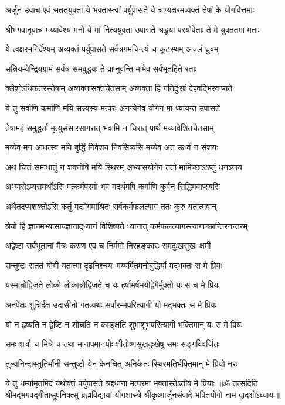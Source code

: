{अर्जुन उवाच}
\twolineshloka
{एवं सततयुक्ता ये भक्तास्त्वां पर्युपासते}
{ये चाप्यक्षरमव्यक्तं तेषां के योगवित्तमाः}%

{श्रीभगवानुवाच}\nopagebreak[4]
\twolineshloka
{मय्यावेश्य मनो ये मां नित्ययुक्ता उपासते}
{श्रद्धया परयोपेताः ते मे युक्ततमा मताः}%

\twolineshloka
{ये त्वक्षरमनिर्देश्यम् अव्यक्तं पर्युपासते}
{सर्वत्रगमचिन्त्यं च कूटस्थम् अचलं ध्रुवम्}%

\twolineshloka
{सन्नियम्येन्द्रियग्रामं सर्वत्र समबुद्धयः}
{ते प्राप्नुवन्ति मामेव सर्वभूतहिते रताः}%

\twolineshloka
{क्लेशोऽधिकतरस्तेषाम् अव्यक्तासक्तचेतसाम्}%
{अव्यक्ता हि गतिर्दुःखं देहवद्भिरवाप्यते}%

\twolineshloka
{ये तु सर्वाणि कर्माणि मयि सन्न्यस्य मत्परः}
{अनन्येनैव योगेन मां ध्यायन्त उपासते}%

\twolineshloka
{तेषामहं समुद्धर्ता मृत्युसंसारसागरात्}
{भवामि न चिरात् पार्थ मय्यावेशितचेतसाम्}%

\twolineshloka
{मय्येव मन आधत्स्व मयि बुद्धिं निवेशय}
{निवसिष्यसि मय्येव अत ऊर्ध्वं न संशयः}%

\twolineshloka
{अथ चित्तं समाधातुं न शक्नोषि मयि स्थिरम्}
{अभ्यासयोगेन ततो मामिच्छाऽऽप्तुं धनञ्जय}%

\twolineshloka
{अभ्यासेऽप्यसमर्थोऽसि मत्कर्मपरमो भव}
{मदर्थमपि कर्माणि कुर्वन् सिद्धिमवाप्स्यसि}%

\twolineshloka
{अथैतदप्यशक्तोऽसि कर्तुं मद्योगमाश्रितः}
{सर्वकर्मफलत्यागं ततः कुरु यतात्मवान्}%

\twolineshloka
{श्रेयो हि ज्ञानमभ्यासाज्ज्ञानाद्‌ध्यानं विशिष्यते}
{ध्यानात् कर्मफलत्यागस्त्यागाच्छान्तिरनन्तरम्}%

\twolineshloka
{अद्वेष्टा सर्वभूतानां मैत्रः करुण एव च}
{निर्ममो निरहङ्कारः समदुःखसुखः क्षमी}%

\twolineshloka
{सन्तुष्टः सततं योगी यतात्मा दृढनिश्चयः}
{मय्यर्पितमनोबुद्धिर्यो मद्भक्तः स मे प्रियः}%

\twolineshloka
{यस्मान्नोद्विजते लोको लोकान्नोद्विजते च यः}
{हर्षामर्षभयोद्वेगैर्मुक्तो यः स च मे प्रियः}%

\twolineshloka
{अनपेक्षः शुचिर्दक्ष उदासीनो गतव्यथः}
{सर्वारम्भपरित्यागी यो मद्भक्तः स मे प्रियः}%

\twolineshloka
{यो न हृष्यति न द्वेष्टि न शोचति न काङ्क्षति}
{शुभाशुभपरित्यागी भक्तिमान् यः स मे प्रियः}%

\twolineshloka
{समः शत्रौ च मित्रे च तथा मानापमानयोः}
{शीतोष्णसुखदुःखेषु समः सङ्गविवर्जितः}%

\twolineshloka
{तुल्यनिन्दास्तुतिर्मौनी सन्तुष्टो येन केनचित्}
{अनिकेतः स्थिरमतिर्भक्तिमान् मे प्रियो नरः}%

\twolineshloka
{ये तु धर्म्यामृतमिदं यथोक्तं पर्युपासते}
{श्रद्दधाना मत्परमा भक्तास्तेऽतीव मे प्रियाः}%
{॥ॐ तत्सदिति श्रीमद्भगवद्गीतासूपनिषत्सु ब्रह्मविद्यायां योगशास्त्रे श्रीकृष्णार्जुनसंवादे भक्तियोगो नाम द्वादशोऽध्यायः॥}